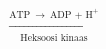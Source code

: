 \documentclass[preview]{standalone}
\begin{document}
\begin{align*}
\xrightarrow[\text{Heksoosi kinaas}]{\text{ATP}\: \rightarrow\: \text{ADP + H}^{+}}
\end{align*}
\end{document}

